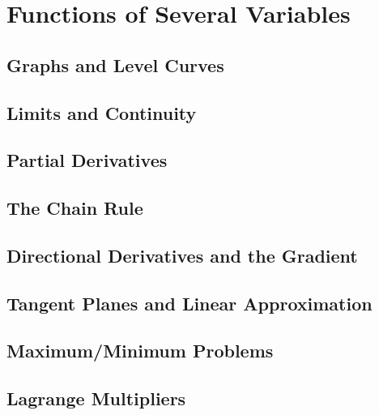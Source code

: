 \documentclass[../calc3.tex]{subfiles}
\begin{document}
\chapter{Functions of Several Variables}
\section{Graphs and Level Curves}
\section{Limits and Continuity}
\section{Partial Derivatives}
\section{The Chain Rule}
\section{Directional Derivatives and the Gradient}
\section{Tangent Planes and Linear Approximation}
\section{Maximum/Minimum Problems}
\section{Lagrange Multipliers}
\end{document}
